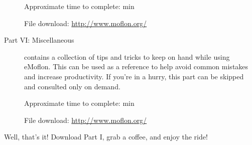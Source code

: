 \begin{description}
{\small Approximate time to complete: min
 
File download: \url{http://www.moflon.org/}}

\item[Part VI: Miscellaneous] contains a collection of tips and tricks to keep on hand while using eMoflon. This can be used as a reference to help avoid common
mistakes and increase productivity. If you're in a hurry, this part can be skipped and consulted only on demand.

{\small Approximate time to complete: min
 
File download: \url{http://www.moflon.org/}}

\end{description}

Well, that's it! Download Part I, grab a coffee, and enjoy the ride!
